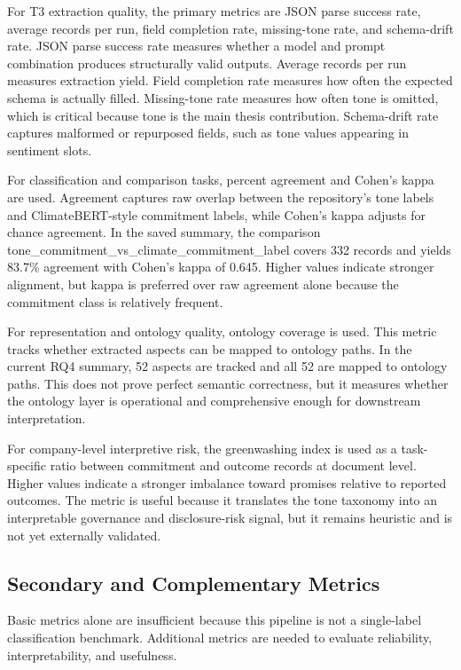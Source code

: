 For T3 extraction quality, the primary metrics are JSON parse success rate, average records per run, field completion rate, missing-tone rate, and schema-drift rate. JSON parse success rate measures whether a model and prompt combination produces structurally valid outputs. Average records per run measures extraction yield. Field completion rate measures how often the expected schema is actually filled. Missing-tone rate measures how often tone is omitted, which is critical because tone is the main thesis contribution. Schema-drift rate captures malformed or repurposed fields, such as tone values appearing in sentiment slots.

For classification and comparison tasks, percent agreement and Cohen’s kappa are used. Agreement captures raw overlap between the repository’s tone labels and ClimateBERT-style commitment labels, while Cohen’s kappa adjusts for chance agreement. In the saved summary, the comparison tone\_commitment\_vs\_climate\_commitment\_label covers 332 records and yields 83.7\% agreement with Cohen’s kappa of 0.645. Higher values indicate stronger alignment, but kappa is preferred over raw agreement alone because the commitment class is relatively frequent.

For representation and ontology quality, ontology coverage is used. This metric tracks whether extracted aspects can be mapped to ontology paths. In the current RQ4 summary, 52 aspects are tracked and all 52 are mapped to ontology paths. This does not prove perfect semantic correctness, but it measures whether the ontology layer is operational and comprehensive enough for downstream interpretation.

For company-level interpretive risk, the greenwashing index is used as a task-specific ratio between commitment and outcome records at document level. Higher values indicate a stronger imbalance toward promises relative to reported outcomes. The metric is useful because it translates the tone taxonomy into an interpretable governance and disclosure-risk signal, but it remains heuristic and is not yet externally validated.

\subsection{Secondary and Complementary Metrics}

Basic metrics alone are insufficient because this pipeline is not a single-label classification benchmark. Additional metrics are needed to evaluate reliability, interpretability, and usefulness.

